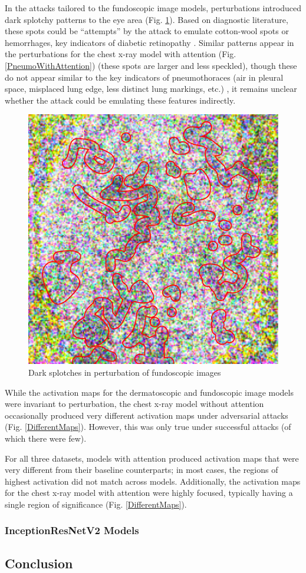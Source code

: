 \documentclass[10pt,twocolumn,letterpaper]{article}
\begin{document}
        In the attacks tailored to the fundoscopic image models, perturbations introduced dark splotchy patterns to the eye area (Fig. \ref{CottonWool}). Based on diagnostic literature, these spots could be ``attempts'' by the attack to emulate cotton-wool spots or hemorrhages, key indicators of diabetic retinopathy \cite{WillsEye}. Similar patterns appear in the perturbations for the chest x-ray model with attention (Fig. \ref{PneumoWithAttention}) (these spots are larger and less speckled), though these do not appear similar to the key indicators of pneumothoraces (air in pleural space, misplaced lung edge, less distinct lung markings, etc.) \cite{UnofficialGuide}, it remains unclear whether the attack could be emulating these features indirectly.

        \begin{figure}[h]
          \centering
          \includegraphics[width=0.5\linewidth]{graphics/ResNet-50/cotton_wool.pdf}
          \caption{Dark splotches in perturbation of fundoscopic images}
          \label{CottonWool}
        \end{figure}

        While the activation maps for the dermatoscopic and fundoscopic image models were invariant to perturbation, the chest x-ray model without attention occasionally produced very different activation maps under adversarial attacks (Fig. \ref{DifferentMaps}). However, this was only true under successful attacks (of which there were few).

        For all three datasets, models with attention produced activation maps that were very different from their baseline counterparts; in most cases, the regions of highest activation did not match across models. Additionally, the activation maps for the chest x-ray model with attention were highly focused, typically having a single region of significance (Fig. \ref{DifferentMaps}).

        

      \subsubsection{InceptionResNetV2 Models}
      
    \subsection{Conclusion} %
      
    
{\small


}

\pagebreak
\appendix
\end{document}
